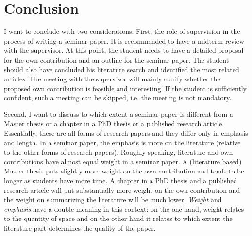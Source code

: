 \documentclass[a4paper,11pt]{article}
\begin{document}
\section{Conclusion}
\label{sec:conclusion}

I want to conclude with two considerations. First, the role of supervision in the process of writing a seminar paper. It is recommended to have a midterm review with the supervisor. At this point, the student needs to have a detailed proposal for the own contribution and an outline for the seminar paper. The student should also have concluded his literature search and identified the most related articles. The meeting with the supervisor will mainly clarify whether the proposed own contribution is feasible and interesting. If the student is sufficiently confident, such a meeting can be skipped, i.e. the meeting is not mandatory.  

Second, I want to discuss to which extent a seminar paper is different from a Master thesis or a chapter in a PhD thesis or a published research article. Essentially, these are all forms of research papers and they differ only in emphasis and length. In a seminar paper, the emphasis is more on the literature (relative to the other forms of research papers). Roughly speaking, literature and own contributions have almost equal weight in a seminar paper. A (literature based) Master thesis puts slightly more weight on the own contribution and tends to be longer as students have more time. A chapter in a PhD thesis and a published research article will put substantially more weight on the own contribution and the weight on summarizing the literature will be much lower. \emph{Weight} and \emph{emphasis} have a double meaning in this context: on the one hand, weight relates to the quantity of space and on the other hand it relates to which extent the literature part determines the quality of the paper.




\end{document}
